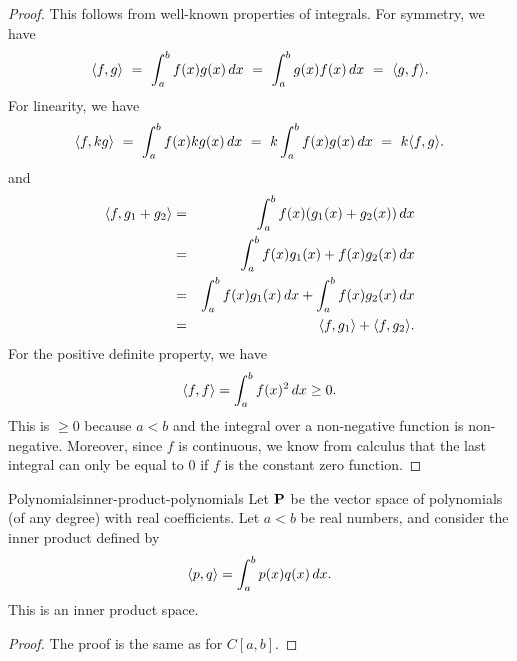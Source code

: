 \begin{proof}
  This follows from well-known properties of integrals. For symmetry,
  we have
  \begin{equation*}
    \langle f,g\rangle
    ~=~ \int_a^b f(x)g(x)\,dx
    ~=~ \int_a^b g(x)f(x)\,dx
    ~=~ \langle g,f\rangle.
  \end{equation*}
  For linearity, we have
  \begin{equation*}
    \langle f,kg\rangle
    ~=~ \int_a^b f(x)kg(x)\,dx
    ~=~ k\int_a^b f(x)g(x)\,dx
    ~=~ k\langle f,g\rangle.
  \end{equation*}
  and
  \begin{eqnarray*}
    \langle f,g_1+g_2\rangle
    &=& \int_a^b f(x)(g_1(x)+g_2(x))\,dx \\
    &=& \int_a^b f(x)g_1(x) + f(x)g_2(x)\,dx \\
    &=& \int_a^b f(x)g_1(x)\,dx + \int_a^b f(x)g_2(x)\,dx \\
    &=& \langle f,g_1\rangle + \langle f,g_2\rangle.
  \end{eqnarray*}
  For the positive definite property, we have
  \begin{equation*}
    \langle f,f\rangle
    = \int_a^b f(x)^2\,dx
    \geq 0.
  \end{equation*}
  This is $\geq 0$ because $a<b$ and the integral over a non-negative
  function is non-negative. Moreover, since $f$ is continuous, we know
  from calculus that the last integral can only be equal to $0$ if $f$
  is the constant zero function.
\end{proof}

\begin{example}{Polynomials}{inner-product-polynomials}
  Let $\mathbf{P}$ be the vector space of polynomials (of any degree) with
  real coefficients. Let $a<b$ be real numbers, and consider the inner
  product defined by
  \begin{equation*}
    \langle p,q\rangle = \int_a^b p(x)q(x)\,dx.
  \end{equation*}
  This is an inner product space.%
\end{example}

\begin{proof}
  The proof is the same as for $C[a,b]$. 
\end{proof}


